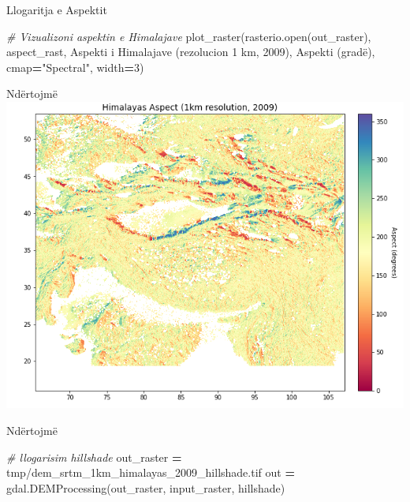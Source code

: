 \documentclass[
  ignorenonframetext,
]{beamer}
\newenvironment{Shaded}{\begin{snugshade}}{\end{snugshade}}
\newcommand{\BuiltInTok}[1]{#1}
\newcommand{\CommentTok}[1]{\textcolor[rgb]{0.56,0.35,0.01}{\textit{#1}}}
\newcommand{\DecValTok}[1]{\textcolor[rgb]{0.00,0.00,0.81}{#1}}
\newcommand{\NormalTok}[1]{#1}
\newcommand{\OperatorTok}[1]{\textcolor[rgb]{0.81,0.36,0.00}{\textbf{#1}}}
\newcommand{\StringTok}[1]{\textcolor[rgb]{0.31,0.60,0.02}{#1}}
\begin{document}
\begin{frame}[fragile]{Llogaritja e Aspektit}
\protect\hypertarget{llogaritja-e-aspektit-2}{}

\begin{Shaded}
\begin{Highlighting}[]
\CommentTok{\# Vizualizoni aspektin e Himalajave}
\NormalTok{plot\_raster(rasterio.}\BuiltInTok{open}\NormalTok{(out\_raster), aspect\_rast, }
            \StringTok{\textquotesingle{}Aspekti i Himalajave (rezolucion 1 km, 2009)\textquotesingle{}}\NormalTok{, }
            \StringTok{\textquotesingle{}Aspekti (gradë)\textquotesingle{}}\NormalTok{, cmap}\OperatorTok{=}\StringTok{"Spectral"}\NormalTok{, width}\OperatorTok{=}\DecValTok{3}\NormalTok{)}
\end{Highlighting}
\end{Shaded}
\end{frame}

\begin{frame}{Ndërtojmë}
\protect\hypertarget{nduxebrtojmuxeb-2}{}
\includegraphics{./Figs/himal.png}
\end{frame}

\begin{frame}[fragile]{Ndërtojmë}
\protect\hypertarget{nduxebrtojmuxeb-3}{}

\begin{Shaded}
\begin{Highlighting}[]
\CommentTok{\# llogarisim hillshade}
\NormalTok{out\_raster }\OperatorTok{=} \StringTok{\textquotesingle{}tmp/dem\_srtm\_1km\_himalayas\_2009\_hillshade.tif\textquotesingle{}}
\NormalTok{out }\OperatorTok{=}\NormalTok{ gdal.DEMProcessing(out\_raster, input\_raster, }\StringTok{\textquotesingle{}hillshade\textquotesingle{}}\NormalTok{)}
\end{Highlighting}
\end{Shaded}
\end{frame}
\end{document}
